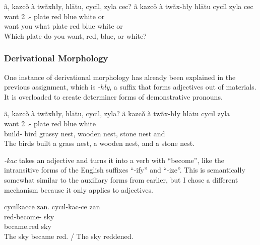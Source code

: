\documentclass[12pt]{article}
\begin{document}
    \begin{exe}
        \ex
        ã, kazcǒ à twãxhły, hlātu, cycīl, zyla cec?
        \glll
        ã kazcǒ à twãx-hły hlātu cycīl zyla cec \\
        \Q{} want 2\Sg{} \Int{}.\Inanim{}-\Adj{} plate red blue white or \\
        \Q{} want you what plate red blue white or \\
        \glt
        Which plate do you want, red, blue, or white?
    \end{exe}

    \subsubsection*{Derivational Morphology}

    One instance of derivational morphology
    has already been explained in the previous assignment,
    which is \textit{-hły},
    a suffix that forms adjectives out of materials.
    It is overloaded to create determiner forms
    of demonstrative pronouns.

    \begin{exe}
        \ex
        ã, kazcǒ à twãxhły, hlātu, cycīl, zyla?
        \glll
        ã kazcǒ à twãx-hły hlātu cycīl zyla  \\
        \Q{} want 2\Sg{} \Int{}.\Inanim{}-\Adj{} plate red blue white \\
        build-\Hst{} bird grassy nest, wooden nest, stone nest and \\
        \glt
        The birds built a grass nest, a wooden nest, and a stone nest.
    \end{exe}

    \textit{-kac} takes an adjective and turns it into a verb
    with ``become'', like the intransitive forms of
    the English suffixes ``-ify'' and ``-ize''.
    This is semantically somewhat similar to the auxiliary forms from earlier,
    but I chose a different mechanism because it only applies to adjectives.

    \begin{exe}
        \ex
        cycīlkacce zān.
        \glll
        cycīl-kac-ce zān \\
        red-become-\Pst{} sky \\
        became.red sky \\
        \glt
        The sky became red.
        /
        The sky reddened.
    \end{exe}
\end{document}
